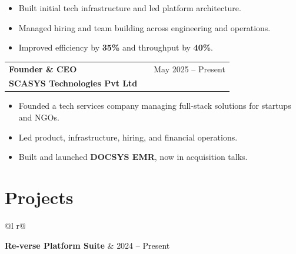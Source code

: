 \documentclass[a4paper,10pt]{article}
\begin{document}
\vspace{-8pt}

\begin{itemize}[nosep, leftmargin=1.5em]

\item Built initial tech infrastructure and led platform architecture.

\item Managed hiring and team building across engineering and operations.

\item Improved efficiency by \textbf{35\%} and throughput by \textbf{40\%}.

\end{itemize}



\begin{tabularx}{\linewidth}{ @{}l X r@{} }

\textbf{Founder \& CEO} & \hfill & \textcolor[HTML]{371e77}{May 2025 -- Present} \\

\textcolor[HTML]{371e77}{\textbf{SCASYS Technologies Pvt Ltd}} & & \\

\end{tabularx}

\vspace{-8pt}

\begin{itemize}[nosep, leftmargin=1.5em]

\item Founded a tech services company managing full-stack solutions for startups and NGOs.

\item Led product, infrastructure, hiring, and financial operations.

\item Built and launched \textbf{DOCSYS EMR}, now in acquisition talks.

\end{itemize}




\section{Projects}



\begin{tabularx}{\linewidth}{ @{}l r@{} }

\textbf{Re-verse Platform Suite} & \textcolor[HTML]{371e77}{2024 -- Present} \\


\end{tabularx}
\end{document}
